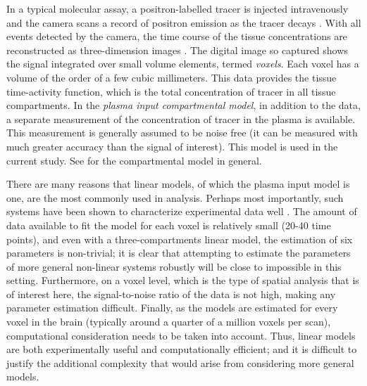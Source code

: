 In a typical molecular assay, a positron-labelled tracer is injected intravenously and the \pet camera scans a record of positron emission as the tracer decays \cite{Phelps2000}. With all events detected by the \pet camera, the time course of the tissue concentrations are reconstructed as three-dimension images \cite{Kinahan1989}. The digital image so captured shows the signal integrated over small volume elements, termed \emph{voxels}. Each voxel has a volume of the order of a few cubic millimeters. This data provides the tissue time-activity function, which is the total concentration of tracer in all tissue compartments. In the \emph{plasma input compartmental model}, in addition to the \pet data, a separate measurement of the concentration of tracer in the plasma is available. This measurement is generally assumed to be noise free (it can be measured with much greater accuracy than the signal of interest). This model is used in the current study. See \cite{Gunn:2001cx} for the \pet compartmental model in general.

There are many reasons that linear \ode models, of which the plasma input model is one, are the most commonly used in \pet analysis. Perhaps most importantly, such systems have been shown to characterize \pet experimental data well \cite{Lammertsma96}. The amount of data available to fit the model for each voxel is relatively small (20-40 time points), and even with a three-compartments linear \ode model, the estimation of six parameters is non-trivial; it is clear that attempting to estimate the parameters of more general non-linear \ode systems robustly will be close to impossible in this setting. Furthermore, on a voxel level, which is the type of spatial analysis that is of interest here, the signal-to-noise ratio of the data is not high, making any parameter estimation difficult. Finally, as the models are estimated for every voxel in the brain (typically around a quarter of a million voxels per scan), computational consideration needs to be taken into account. Thus, linear \ode models are both experimentally useful and computationally efficient; and it is difficult to justify the additional complexity that would arise from considering more general models.



